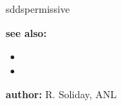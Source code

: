 \begin{sddsprog}{sddspermissive}
\item \textbf{see also:}
\begin{itemize}
  \item {}
  \item {}
\end{itemize}

\item \textbf{author:} R. Soliday, ANL
\end{sddsprog}
